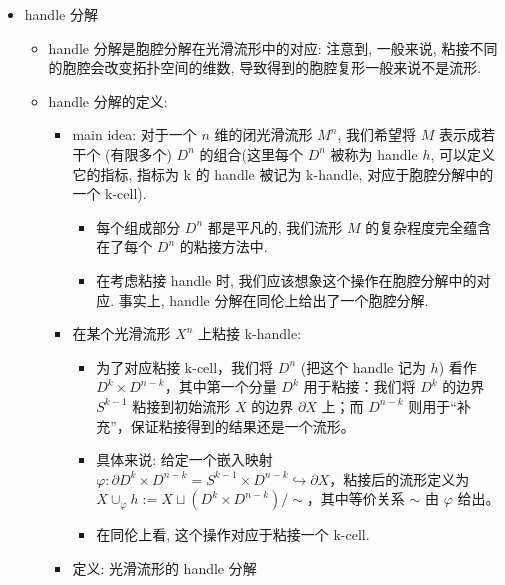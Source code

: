 \documentclass[
]{ctexart}
\providecommand{\tightlist}{%
  \setlength{\itemsep}{0pt}\setlength{\parskip}{0pt}}
\begin{document}
\begin{itemize}
  \begin{itemize}
  \tightlist
  \item
    Smale: weak GPC 在 \(n\geq5\) 的情形下成立.
  \item
    这个结果弱于GPC, 因为它要求流形是光滑的.
    然而我们关心的多数流形都是光滑的, 故这个结果也足够重要.
  \item
    weak GPC 的证明主要依赖于 h-cobordism 定理.
  \end{itemize}
\item
  handle 分解

  \begin{itemize}
  \tightlist
  \item
    handle 分解是胞腔分解在光滑流形中的对应: 注意到, 一般来说,
    粘接不同的胞腔会改变拓扑空间的维数,
    导致得到的胞腔复形一般来说不是流形.
  \item
    handle 分解的定义:

    \begin{itemize}
    \tightlist
    \item
      main idea: 对于一个 \(n\) 维的闭光滑流形 \(M^n\), 我们希望将 \(M\)
      表示成若干个 (有限多个) \(D^n\) 的组合(这里每个 \(D^n\) 被称为
      handle \(h\), 可以定义它的指标, 指标为 k 的 handle 被记为
      k-handle, 对应于胞腔分解中的一个 k-cell).

      \begin{itemize}
      \tightlist
      \item
        每个组成部分 \(D^n\) 都是平凡的, 我们流形 \(M\)
        的复杂程度完全蕴含在了每个 \(D^n\) 的粘接方法中.
      \item
        在考虑粘接 handle 时, 我们应该想象这个操作在胞腔分解中的对应.
        事实上, handle 分解在同伦上给出了一个胞腔分解.
      \end{itemize}
    \item
      在某个光滑流形 \(X^n\) 上粘接 k-handle:

      \begin{itemize}
      \tightlist
      \item
        为了对应粘接 k-cell，我们将 \(D^n\) (把这个 handle 记为 \(h\))
        看作 \(D^k\times D^{n-k}\)，其中第一个分量 \(D^k\)
        用于粘接：我们将 \(D^k\) 的边界 \(S^{k-1}\) 粘接到初始流形 \(X\)
        的边界 \(\partial X\) 上；而 \(D^{n-k}\)
        则用于``补充''，保证粘接得到的结果还是一个流形。
      \item
        具体来说: 给定一个嵌入映射
        \(\varphi: \partial D^k\times D^{n-k}=S^{k-1} \times D^{n-k} \hookrightarrow \partial X\)，粘接后的流形定义为
        \(X \cup_{\varphi} h := X \sqcup (D^k \times D^{n-k}) / \sim\)，其中等价关系
        \(\sim\) 由 \(\varphi\) 给出。
      \item
        在同伦上看, 这个操作对应于粘接一个 k-cell.
      \end{itemize}
    \item
      定义: 光滑流形的 handle 分解


\end{itemize}
\end{itemize}
\end{itemize}
\end{document}
